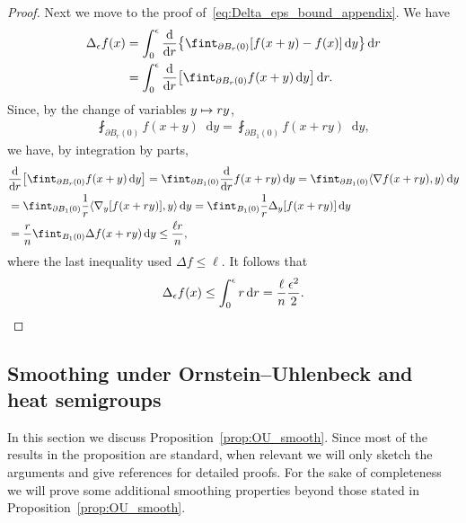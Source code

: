 \documentclass[AHL,Unicode,longabstracts]{cedram}
\newcommand{\dd}{n}
\newcommand*\diff{\mathop{}\!\mathrm{d}}
\newcommand{\avgint}{\fint}
\let\oldmapsto\mapsto
\renewcommand*{\mapsto}{\mathchoice{\longmapsto}{\oldmapsto}{\oldmapsto}{\oldmapsto}}
\let\originalleft\left
\let\originalright\right
\renewcommand{\left}{\mathopen{}\mathclose\bgroup\originalleft}
\renewcommand{\right}{\aftergroup\egroup\originalright}
\begin{document}
\begin{proof}
Next we move to the proof of~\eqref{eq:Delta_eps_bound_appendix}. We have
\begin{align*}
\Delta_{\epsilon}f(x)&=\int_0^{\epsilon} \frac{\diff}{\diff r}\left\{\avgint_{\partial B_{r}(0)}[f(x+y)-f(x)]\diff y\right\}\diff r\\
&=\int_0^{\epsilon} \frac{\diff}{\diff r}\left[\avgint_{\partial B_{r}(0)}f(x+y)\diff y\right]\diff r.
\end{align*}
Since, by the change of variables $y\mapsto r y$,
\begin{align*}
\avgint_{\partial B_{r}(0)}f(x+y)\diff y=\avgint_{\partial B_1(0)}f(x+ry)\diff y,
\end{align*}
we have, by integration by parts,
\begin{align*}
&\frac{\diff}{\diff r}\left[\avgint_{\partial B_{r}(0)}f(x+y)\diff y\right]=\avgint_{\partial B_1(0)}\frac{\diff}{\diff r}f(x+ry)\diff y=\avgint_{\partial B_1(0)}\langle\nabla f(x+ry),y\rangle\diff y\\
&=\avgint_{\partial B_1(0)}\frac{1}{r}\langle\nabla_y [f(x+ry)],y\rangle\diff y=\avgint_{ B_1(0)}\frac{1}{r}\Delta_y[f(x+ry)]\diff y\\
&=\frac{r}{\dd}\avgint_{B_1(0)}\Delta f(x+ry)\diff y\le \frac{\ell r}{\dd},
\end{align*}
where the last inequality used $\Delta f\le \ell$. It follows that
\[
\Delta_{\epsilon}f(x)\le \int_0^{\epsilon}r\diff r=\frac{\ell}{\dd}\frac{\epsilon^2}{2}.\qedhere
\]
\end{proof}

\subsection{Smoothing under Ornstein--Uhlenbeck and heat semigroups}\label{subsec:appendix_smooth}
In this section we discuss Proposition~\ref{prop:OU_smooth}. Since most of the results in the proposition are standard, when relevant we will only sketch the arguments and give references for detailed proofs. For the sake of completeness we will prove some additional smoothing properties beyond those stated in Proposition~\ref{prop:OU_smooth}.
\end{document}
